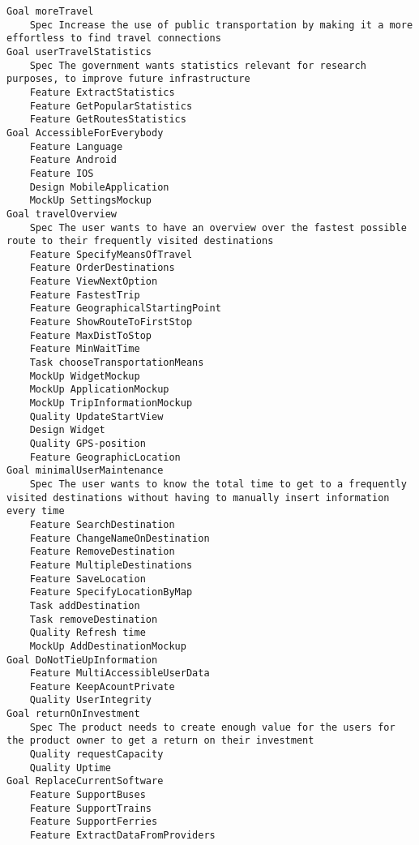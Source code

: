 

\begin{lstlisting}
Goal moreTravel
	Spec Increase the use of public transportation by making it a more effortless to find travel connections
Goal userTravelStatistics
	Spec The government wants statistics relevant for research purposes, to improve future infrastructure
	Feature ExtractStatistics
	Feature GetPopularStatistics
	Feature GetRoutesStatistics
Goal AccessibleForEverybody
	Feature Language
	Feature Android
	Feature IOS
	Design MobileApplication
	MockUp SettingsMockup
Goal travelOverview
	Spec The user wants to have an overview over the fastest possible route to their frequently visited destinations
	Feature SpecifyMeansOfTravel
	Feature OrderDestinations
	Feature ViewNextOption
	Feature FastestTrip
	Feature GeographicalStartingPoint
	Feature ShowRouteToFirstStop
	Feature MaxDistToStop
	Feature MinWaitTime
	Task chooseTransportationMeans
	MockUp WidgetMockup
	MockUp ApplicationMockup
	MockUp TripInformationMockup
	Quality UpdateStartView
	Design Widget
	Quality GPS-position
	Feature GeographicLocation
Goal minimalUserMaintenance
	Spec The user wants to know the total time to get to a frequently visited destinations without having to manually insert information every time
	Feature SearchDestination
	Feature ChangeNameOnDestination
	Feature RemoveDestination
	Feature MultipleDestinations
	Feature SaveLocation
	Feature SpecifyLocationByMap
	Task addDestination
	Task removeDestination
	Quality Refresh time
	MockUp AddDestinationMockup
Goal DoNotTieUpInformation
	Feature MultiAccessibleUserData
	Feature KeepAcountPrivate
	Quality UserIntegrity
Goal returnOnInvestment
	Spec The product needs to create enough value for the users for the product owner to get a return on their investment
	Quality requestCapacity
	Quality Uptime
Goal ReplaceCurrentSoftware
	Feature SupportBuses
	Feature SupportTrains
	Feature SupportFerries
	Feature ExtractDataFromProviders

\end{lstlisting}